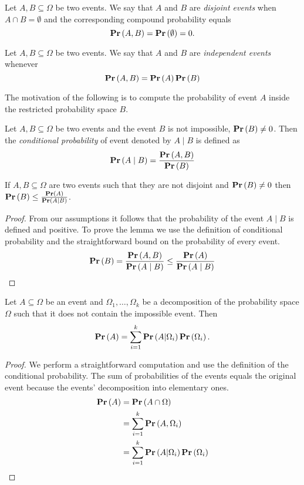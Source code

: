 \begin{definition}
Let $A, B \subseteq \Omega$ be two events. We say that $A$ and $B$ are \emph{disjoint events} when $A \cap B = \emptyset$ and the corresponding compound probability equals
\[
\mathbf{Pr}\left(A, B\right) = \mathbf{Pr}\left(\emptyset\right) = 0 \text{.}
\]
\end{definition}

\begin{definition}
Let $A, B \subseteq \Omega$ be two events. We say that $A$ and $B$ are \emph{independent events} whenever
\[
\mathbf{Pr}\left(A, B\right) = \mathbf{Pr}\left(A\right)\mathbf{Pr}\left(B\right)
\]
\end{definition}

The motivation of the following is to compute the probability of event $A$ inside the restricted probability space $B$.
\begin{definition}
Let $A, B \subseteq \Omega$ be two events and the event $B$ is not impossible, $\mathbf{Pr}\left(B\right) \neq 0$. Then the \emph{conditional probability} of event denoted by $A \mid B$ is defined as
\[
\mathbf{Pr}\left(A \mid B\right) = \frac{\mathbf{Pr}\left(A, B\right)}{\mathbf{Pr}\left(B\right)}
\]
\end{definition}

\begin{lemma}
If $A, B \subseteq \Omega$ are two events such that they are not disjoint and $\mathbf{Pr}\left(B\right) \neq 0$ then $\mathbf{Pr}\left(B\right) \leq \frac{\mathbf{Pr}\left(A\right)}{\mathbf{Pr}\left(A \mid B\right)}$.
\end{lemma}
\begin{proof}
From our assumptions it follows that the probability of the event $A \mid B$ is defined and positive. To prove the lemma we use the definition of conditional probability and the straightforward bound on the probability of every event.
\[
\mathbf{Pr}\left(B\right) = \frac{\mathbf{Pr}\left(A, B\right)}{\mathbf{Pr}\left(A \mid B\right)} \leq \frac{\mathbf{Pr}\left(A\right)}{\mathbf{Pr}\left(A \mid B\right)}
\]
\end{proof}

\begin{theorem}
Let $A \subseteq \Omega$ be an event and $\Omega_1, \dots, \Omega_k$ be a decomposition of the probability space $\Omega$ such that it does not contain the impossible event. Then
\[
\mathbf{Pr}\left(A\right) = \displaystyle\sum_{i = 1}^{k} \mathbf{Pr}\left(A | \Omega_i\right) \mathbf{Pr}\left(\Omega_i\right) \text{.}
\]
\end{theorem}
\begin{proof}
We perform a straightforward computation and use the definition of the conditional probability. The sum of probabilities of the events equals the original event because the events' decomposition into elementary ones.
\[
\begin{split}
\mathbf{Pr}\left(A\right)
	& = \mathbf{Pr}\left(A \cap \Omega\right) \\
	& = \displaystyle\sum_{i = 1}^{k} \mathbf{Pr}\left(A, \Omega_i\right) \\
	& = \displaystyle\sum_{i = 1}^{k} \mathbf{Pr}\left(A | \Omega_i\right) \mathbf{Pr}\left(\Omega_i\right) \\
\end{split}
\]
\end{proof}

